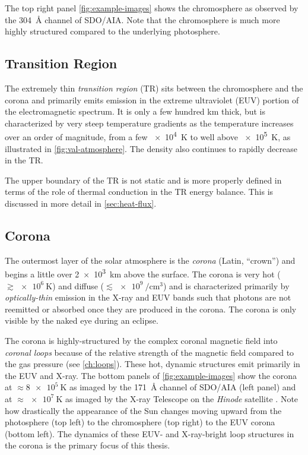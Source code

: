 The top right panel \autoref{fig:example-images} shows the chromosphere as observed by the \SI{304}{\angstrom} channel of SDO/AIA. Note that the chromosphere is much more highly structured compared to the underlying photosphere.

\subsection{Transition Region}\label{sec:transition_region}

The extremely thin \textit{transition region} (TR) sits between the chromosphere and the corona and primarily emits emission in the extreme ultraviolet (EUV) portion of the electromagnetic spectrum. It is only a few hundred \si{\km} thick, but is characterized by very steep temperature gradients as the temperature increases over an order of magnitude, from a few \SI{e4}{\kelvin} to well above \SI{e5}{\kelvin}, as illustrated in \autoref{fig:val-atmosphere}. The density also continues to rapidly decrease in the TR.

The upper boundary of the TR is not static and is more properly defined in terms of the role of thermal conduction in the TR energy balance. This is discussed in more detail in \autoref{sec:heat-flux}.  

\subsection{Corona}\label{sec:corona}

The outermost layer of the solar atmosphere is the \textit{corona} (Latin, ``crown'') and begins a little over \SI{2e3}{\km} above the surface. The corona is very hot ($\gtrsim\SI{e6}{\kelvin}$) and diffuse ($\lesssim\SI{e9}{\per\cubic\cm}$) and is characterized primarily by \textit{optically-thin} emission in the X-ray and EUV bands such that photons are not reemitted or absorbed once they are produced in the corona. The corona is only visible by the naked eye during an eclipse.

The corona is highly-structured by the complex coronal magnetic field into \textit{coronal loops} because of the relative strength of the magnetic field compared to the gas pressure (see \autoref{ch:loops}). These hot, dynamic structures emit primarily in the EUV and X-ray. The bottom panels of \autoref{fig:example-images} show the corona at $\approx\SI{8e5}{\kelvin}$ as imaged by the \SI{171}{\angstrom} channel of SDO/AIA (left panel) and at $\approx\SI{e7}{\kelvin}$ as imaged by the X-ray Telescope \citep[XRT][]{golub_x-ray_2007} on the \textit{Hinode} satellite \citep{kosugi_hinode_2007}. Note how drastically the appearance of the Sun changes moving upward from the photosphere (top left) to the chromosphere (top right) to the EUV corona (bottom left). The dynamics of these EUV- and X-ray-bright loop structures in the corona is the primary focus of this thesis.

